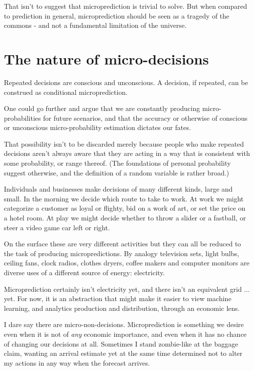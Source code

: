 That isn't to suggest that microprediction is trivial to solve. But when compared to prediction in general, microprediction should be seen as a tragedy of the commons - and not a fundamental limitation of the universe. 


\section{The nature of micro-decisions}

Repeated decisions are conscious and unconscious. A decision, if repeated, can be construed as conditional microprediction.


One could go further and argue that we are constantly producing micro-probabilities for future scenarios, and that the accuracy or otherwise of conscious or unconscious micro-probability estimation dictates our fates.  

That possibility isn't to be discarded merely because people who make repeated decisions aren't always aware that they are acting in a way that is consistent with some probability, or range thereof. (The foundations of personal probability suggest otherwise, and the definition of a random variable is rather broad.)


Individuals and businesses make decisions of many different kinds, large and small. In the morning we decide which route to take to work. At work we might categorize a customer as loyal or flighty, bid on a work of art, or set the price on a hotel room. At play we might decide whether to throw a slider or a fastball, or steer a video game car left or right.   


On the surface these are very different activities but they can all be reduced to the task of producing micropredictions. By analogy television sets, light bulbs, ceiling fans, clock radios, clothes dryers, coffee makers and computer monitors are diverse uses of a different source of energy: electricity. 


Microprediction certainly isn't electricity yet, and there isn't an equivalent grid ... yet. For now, it is an abstraction that might make it easier to view machine learning, and analytics production and distribution, through an economic lens. 

I dare say there are micro-non-decisions. Microprediction is something we desire even when it is not of {\em any} economic importance, and even when it has no chance of changing our decisions at all. Sometimes I stand zombie-like at the baggage claim, wanting an arrival estimate yet at the same time determined not to alter my actions in any way when the forecast arrives. 

